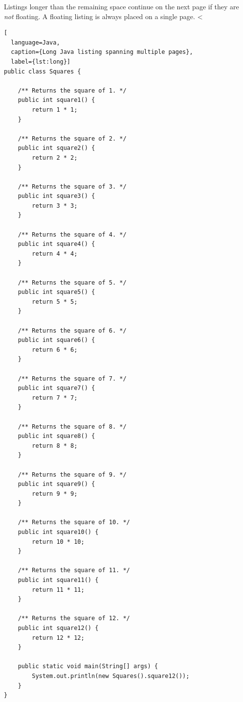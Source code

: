 Listings longer than the remaining space continue on the next page if they are \emph{not} floating.
A floating listing is always placed on a single page.
<%

\begin{lstlisting}[
  language=Java,
  caption={Long Java listing spanning multiple pages},
  label={lst:long}]
public class Squares {

    /** Returns the square of 1. */
    public int square1() {
        return 1 * 1;
    }

    /** Returns the square of 2. */
    public int square2() {
        return 2 * 2;
    }

    /** Returns the square of 3. */
    public int square3() {
        return 3 * 3;
    }

    /** Returns the square of 4. */
    public int square4() {
        return 4 * 4;
    }

    /** Returns the square of 5. */
    public int square5() {
        return 5 * 5;
    }

    /** Returns the square of 6. */
    public int square6() {
        return 6 * 6;
    }

    /** Returns the square of 7. */
    public int square7() {
        return 7 * 7;
    }

    /** Returns the square of 8. */
    public int square8() {
        return 8 * 8;
    }

    /** Returns the square of 9. */
    public int square9() {
        return 9 * 9;
    }

    /** Returns the square of 10. */
    public int square10() {
        return 10 * 10;
    }

    /** Returns the square of 11. */
    public int square11() {
        return 11 * 11;
    }

    /** Returns the square of 12. */
    public int square12() {
        return 12 * 12;
    }

    public static void main(String[] args) {
        System.out.println(new Squares().square12());
    }
}
\end{lstlisting}

